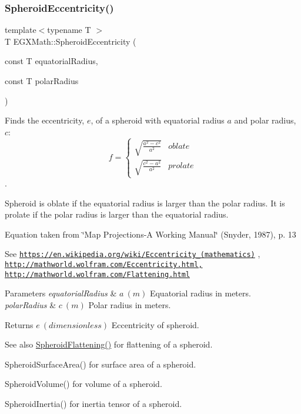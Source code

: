 \subsubsection{\texorpdfstring{Spheroid\+Eccentricity()}{SpheroidEccentricity()}\hspace{0.1cm}{\footnotesize\ttfamily [2/2]}}
{\footnotesize\ttfamily template$<$typename T $>$ \\
T E\+G\+X\+Math\+::\+Spheroid\+Eccentricity (\begin{DoxyParamCaption}\item[{const T}]{equatorial\+Radius,  }\item[{const T}]{polar\+Radius }\end{DoxyParamCaption})}



Finds the eccentricity, $e$, of a spheroid with equatorial radius $a$ and polar radius, $c$\+: \[ f =\begin{cases} \sqrt{\frac{a^2-c^2}{a^2}} & oblate \\ \sqrt{\frac{c^2-a^2}{a^2}} & prolate \end{cases} \]. 

Spheroid is oblate if the equatorial radius is larger than the polar radius. It is prolate if the polar radius is larger than the equatorial radius.

Equation taken from \char`\"{}\+Map Projections-\/\+A Working Manual\char`\"{} (Snyder, 1987), p. 13

See \href{https://en.wikipedia.org/wiki/Eccentricity_(mathematics)}{\tt https\+://en.\+wikipedia.\+org/wiki/\+Eccentricity\+\_\+(mathematics)} , \href{http://mathworld.wolfram.com/Eccentricity.html,}{\tt http\+://mathworld.\+wolfram.\+com/\+Eccentricity.\+html,} \href{http://mathworld.wolfram.com/Flattening.html}{\tt http\+://mathworld.\+wolfram.\+com/\+Flattening.\+html} 
\begin{DoxyParams}{Parameters}
{\em equatorial\+Radius} & $ a\ (m)$ Equatorial radius in meters. \\
\hline
{\em polar\+Radius} & $ c\ (m)$ Polar radius in meters. \\
\hline
\end{DoxyParams}
\begin{DoxyReturn}{Returns}
$ e\ (dimensionless)$ Eccentricity of spheroid. 
\end{DoxyReturn}
\begin{DoxySeeAlso}{See also}
\mbox{\hyperlink{group___e_g_x_math-_geometry-3_d-_spheroid-_flattening_ga640f4bcd86aa4c378819bffda31c0852}{Spheroid\+Flattening()}} for flattening of a spheroid. 

Spheroid\+Surface\+Area() for surface area of a spheroid. 

Spheroid\+Volume() for volume of a spheroid. 

Spheroid\+Inertia() for inertia tensor of a spheroid. 
\end{DoxySeeAlso}

